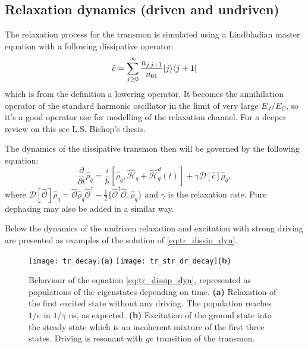 \documentclass[12pt, twoside]{report}
\DeclarePairedDelimiter\bra{\langle}{\rvert}
\DeclarePairedDelimiter\ket{\lvert}{\rangle}
\numberwithin{equation}{section}
\begin{document}
\subsection{Relaxation dynamics (driven and undriven)}

The relaxation process for the transmon is simulated using a Lindbladian master equation with a following dissipative operator:
\begin{equation}
\hat c = \sum_{j\geq 0}^\infty \frac{n_{j\,j+1} }{n_{01}}\ket{j}\bra{j+1}
\end{equation}
which is from the definition a lowering operator. It becomes the annihilation operator of the standard harmonic oscillator in the limit of very large $E_J/E_C$, so it's a good operator use for  modelling of the relaxation channel. For a deeper review on this see L.S. Bishop's thesis.\cite{Bishop2010}

The dynamics of the dissipative transmon then will be governed by the following equation:
\begin{equation}
\frac{\partial}{\partial t} \hat{\rho}_q = \frac{i}{\hbar}[\hat{\rho}_q, \hat{\mathcal{H}}_q+\hat{\mathcal{H}}_q^d(t)] + \gamma \mathcal{D}[\hat c]\hat\rho_q,
\label{eq:tr_dissip_dyn}
\end{equation}
where $ \mathcal{D}[\hat{\mathcal{O}}]\hat\rho_q = \hat{\mathcal{O}} \hat\rho_q \hat{\mathcal{O}}^\dag - \frac{1}{2}\{\hat{\mathcal{O}}^\dag \hat{\mathcal{O}}, \hat\rho_q \}$ and $\gamma$ is the relaxation rate. Pure dephasing may also be added in a similar way.

Below the dynamics of the undriven relaxation and excitation with strong driving are presented as examples of the solution of \eqref{eq:tr_dissip_dyn}.

\begin{figure}[h]
\texttt{[image: tr\_decay]}\hspace{-7.5cm}\textbf{(a)}\hspace{6.5cm}
\texttt{[image: tr\_str\_dr\_decay]}\hspace{-7.5cm}\textbf{(b)}\hspace{6.5cm}
\caption{Behaviour of the equation \eqref{eq:tr_dissip_dyn}, represented as populations of the eigenstates depending on time. \textbf{(a)} Relaxation of the first excited state without any driving. The population reaches $1/e$ in $1/\gamma$ ns, as expected. \textbf{(b)} Excitation of the ground state into the steady state which is an incoherent mixture of the first three states. Driving is resonant with $ge$ transition of the transmon.}
\end{figure}
\end{document}
